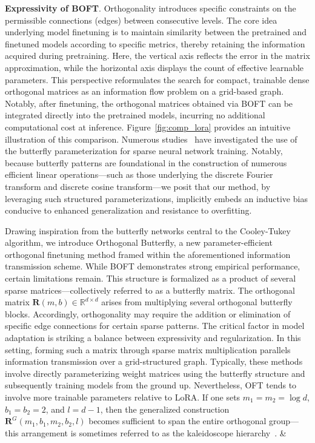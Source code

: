 \textbf{Expressivity of BOFT}. Orthogonality introduces specific constraints on the permissible connections (edges) between consecutive levels. The core idea underlying model finetuning is to maintain similarity between the pretrained and finetuned models according to specific metrics, thereby retaining the information acquired during pretraining. Here, the vertical axis reflects the error in the matrix approximation, while the horizontal axis displays the count of effective learnable parameters. This perspective reformulates the search for compact, trainable dense orthogonal matrices as an information flow problem on a grid-based graph. Notably, after finetuning, the orthogonal matrices obtained via BOFT can be integrated directly into the pretrained models, incurring no additional computational cost at inference. Figure~\ref{fig:comp_lora} provides an intuitive illustration of this comparison. Numerous studies~\cite{dao2019learning,dao2019kaleidoscope,chen2022pixelated,dao2022monarch} have investigated the use of the butterfly parameterization for sparse neural network training. Notably, because butterfly patterns are foundational in the construction of numerous efficient linear operations—such as those underlying the discrete Fourier transform and discrete cosine transform—we posit that our method, by leveraging such structured parameterizations, implicitly embeds an inductive bias conducive to enhanced generalization and resistance to overfitting. \item Drawing inspiration from the butterfly networks central to the Cooley-Tukey algorithm, we introduce Orthogonal Butterfly, a new parameter-efficient orthogonal finetuning method framed within the aforementioned information transmission scheme. While BOFT demonstrates strong empirical performance, certain limitations remain. This structure is formalized as a product of several sparse matrices—collectively referred to as a butterfly matrix. The orthogonal matrix $\bm{R}(m,b)\in\mathbb{R}^{d\times d}$ arises from multiplying several orthogonal butterfly blocks. Accordingly, orthogonality may require the addition or elimination of specific edge connections for certain sparse patterns. The critical factor in model adaptation is striking a balance between expressivity and regularization. In this setting, forming such a matrix through sparse matrix multiplication parallels information transmission over a grid-structured graph. Typically, these methods involve directly parameterizing weight matrices using the butterfly structure and subsequently training models from the ground up. Nevertheless, OFT tends to involve more trainable parameters relative to LoRA. If one sets $m_1=m_2=\log d$, $b_1=b_2=2$, and $l=d-1$, then the generalized construction $\bm{R}^G(m_1,b_1,m_2,b_2,l)$ becomes sufficient to span the entire orthogonal group—this arrangement is sometimes referred to as the kaleidoscope hierarchy~\cite{dao2019kaleidoscope}. &  \\
